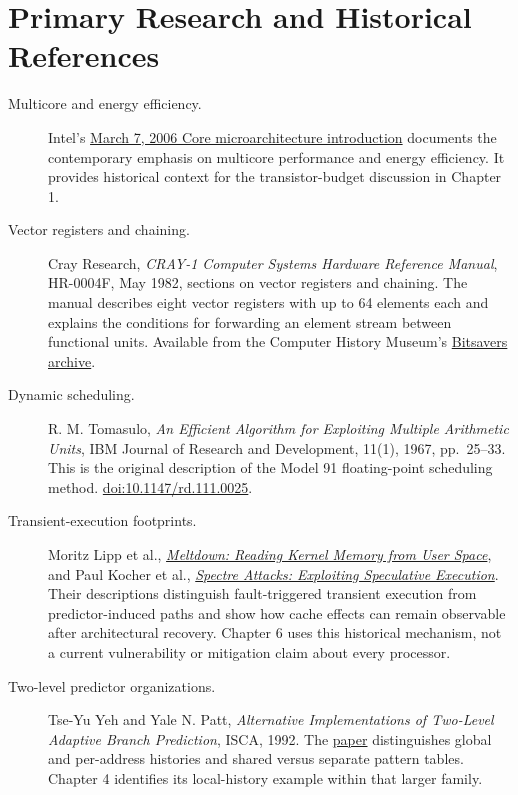 \section*{Primary Research and Historical References}
\begin{description}
  \item[Multicore and energy efficiency.] Intel's \href{https://www.intel.com/pressroom/archive/releases/2006/20060307corp.htm}{March 7, 2006 Core microarchitecture introduction} documents the contemporary emphasis on multicore performance and energy efficiency. It provides historical context for the transistor-budget discussion in Chapter 1.
  \item[Vector registers and chaining.] Cray Research, \emph{CRAY-1 Computer Systems Hardware Reference Manual}, HR-0004F, May 1982, sections on vector registers and chaining. The manual describes eight vector registers with up to 64 elements each and explains the conditions for forwarding an element stream between functional units. Available from the Computer History Museum's \href{https://bitsavers.computerhistory.org/pdf/cray/CRAY-1/HR-0004F_CRAY-1_Computer_Systems_Hardware_Reference_Manual_May82.pdf}{Bitsavers archive}.
  \item[Dynamic scheduling.] R. M. Tomasulo, \emph{An Efficient Algorithm for Exploiting Multiple Arithmetic Units}, IBM Journal of Research and Development, 11(1), 1967, pp.\ 25--33. This is the original description of the Model 91 floating-point scheduling method. \href{https://doi.org/10.1147/rd.111.0025}{doi:10.1147/rd.111.0025}.
  \item[Transient-execution footprints.] Moritz Lipp et al., \href{https://meltdownattack.com/meltdown.pdf}{\emph{Meltdown: Reading Kernel Memory from User Space}}, and Paul Kocher et al., \href{https://spectreattack.com/spectre.pdf}{\emph{Spectre Attacks: Exploiting Speculative Execution}}. Their descriptions distinguish fault-triggered transient execution from predictor-induced paths and show how cache effects can remain observable after architectural recovery. Chapter 6 uses this historical mechanism, not a current vulnerability or mitigation claim about every processor.
  \item[Two-level predictor organizations.] Tse-Yu Yeh and Yale N. Patt, \emph{Alternative Implementations of Two-Level Adaptive Branch Prediction}, ISCA, 1992. The \href{https://people.eecs.berkeley.edu/~kubitron/courses/cs252-S09/handouts/papers/p451-yeh.pdf}{paper} distinguishes global and per-address histories and shared versus separate pattern tables. Chapter 4 identifies its local-history example within that larger family.

\end{description}
